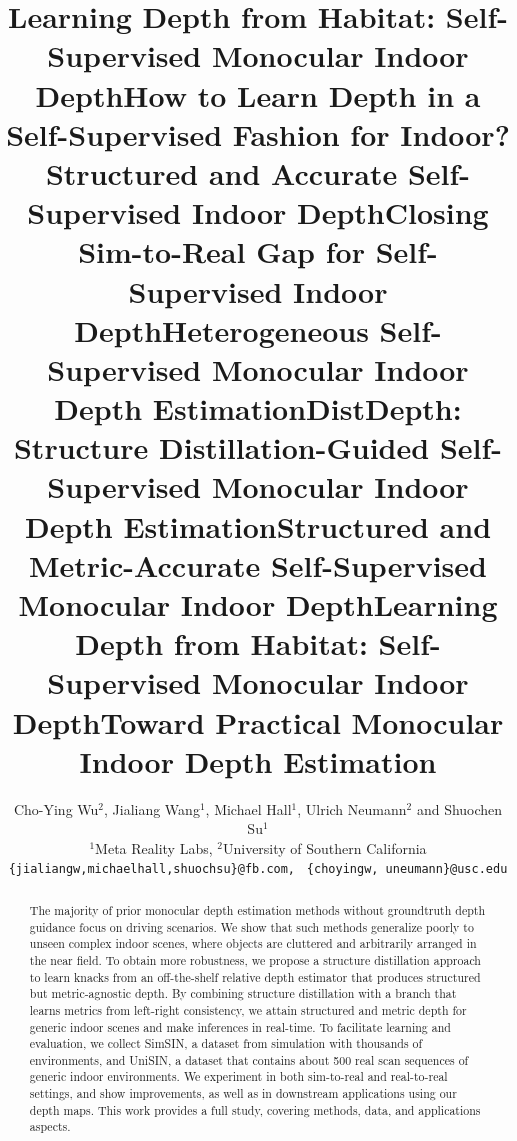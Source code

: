\documentclass[10pt,twocolumn,letterpaper]{article}
\begin{document}
\title{Learning Depth from Habitat: Self-Supervised Monocular Indoor Depth}
\title{How to Learn Depth in a Self-Supervised Fashion for Indoor?}
\title{Structured and Accurate Self-Supervised Indoor Depth}
\title{Closing Sim-to-Real Gap for Self-Supervised Indoor Depth}
\title{Heterogeneous Self-Supervised Monocular Indoor Depth Estimation}
\title{DistDepth: Structure Distillation-Guided Self-Supervised Monocular Indoor Depth Estimation}
\title{Structured and Metric-Accurate Self-Supervised Monocular Indoor Depth}
\title{Learning Depth from Habitat: Self-Supervised Monocular Indoor Depth}
\title{Toward Practical Monocular Indoor Depth Estimation}

\author{Cho-Ying Wu$^{2}$, Jialiang Wang$^{1}$, Michael Hall$^{1}$, Ulrich Neumann$^{2}$ and Shuochen Su$^{1}$ \\
$^1$Meta Reality Labs, $^2$University of Southern California\\
{\tt\small \{jialiangw,michaelhall,shuochsu\}@fb.com, }
{\tt\small \{choyingw, uneumann\}@usc.edu}
}
\makeatletter
\let\@oldmaketitle\@maketitle
\renewcommand{\@maketitle}{\@oldmaketitle
  \centering\texttt{[image: figures/teaser.pdf]}
  \captionof{figure}{\textbf{Advantages of our framework.} (A) We attain zero-shot cross-dataset inference. (B) Our framework trained on simulation data produces on-par results with the one trained on real data.\\}
  \label{teaser}}

\maketitle
\begin{abstract}
The majority of prior monocular depth estimation methods without groundtruth depth guidance focus on driving scenarios. We show that such methods generalize poorly to unseen complex indoor scenes, where objects are cluttered and arbitrarily arranged in the near field. To obtain more robustness, we propose a structure distillation approach to learn knacks from an off-the-shelf relative depth estimator that produces structured but metric-agnostic depth. By combining structure distillation with a branch that learns metrics from left-right consistency, we attain structured and metric depth for generic indoor scenes and make inferences in real-time. To facilitate learning and evaluation, we collect SimSIN, a dataset from simulation with thousands of environments, and UniSIN, a dataset that contains about 500 real scan sequences of generic indoor environments. We experiment in both sim-to-real and real-to-real settings, and show improvements, as well as in downstream applications using our depth maps. This work provides a full study, covering methods, data, and applications aspects.
\end{abstract}
\end{document}
